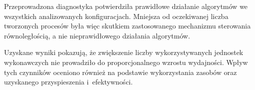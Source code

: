 Przeprowadzona diagnostyka potwierdziła prawidłowe działanie algorytmów we wszystkich analizowanych konfiguracjach. 
Mniejsza od oczekiwanej liczba tworzonych procesów była więc skutkiem zastosowanego mechanizmu sterowania równoległością, 
a nie nieprawidłowego działania algorytmów.

Uzyskane wyniki pokazują, że zwiększenie liczby wykorzystywanych jednostek wykonawczych nie prowadziło do proporcjonalnego wzrostu wydajności.
Wpływ tych czynników oceniono również na podstawie wykorzystania zasobów oraz uzyskanego przyspieszenia i~efektywności.
